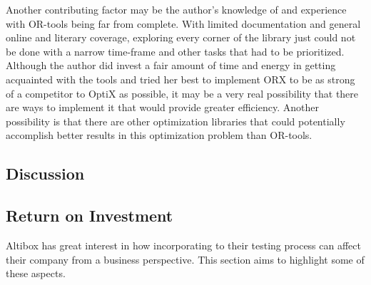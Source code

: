 Another contributing factor may be the author's knowledge of and experience with OR-tools being far from complete. With limited documentation and general online and literary coverage, exploring every corner of the library just could not be done with a narrow time-frame and other tasks that had to be prioritized. Although the author did invest a fair amount of time and energy in getting acquainted with the tools and tried her best to implement ORX to be as strong of a competitor to OptiX as possible, it may be a very real possibility that there are ways to implement it that would provide greater efficiency. Another possibility is that there are other optimization libraries that could potentially accomplish better results in this optimization problem than OR-tools.

\subsection{Discussion}












\subsection{Return on Investment}

Altibox has great interest in how incorporating \toolname \space to their testing process can affect their company from a business perspective. This section aims to highlight some of these aspects.

